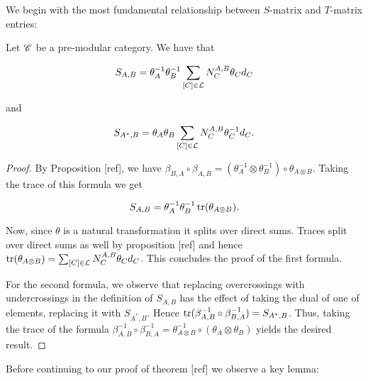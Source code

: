 We begin with the most fundamental relationship between $S$-matrix and $T$-matrix entries:


\begin{lemma} Let $\mathscr{C}$ be a pre-modular category. We have that

$$S_{A,B}=\theta_A^{-1}\theta_{B}^{-1}\sum_{[C]\in \mathcal{L}}N^{A,B}_{C}\theta_{C}d_C$$

and

$$S_{A^*,B}=\theta_A\theta_{B}\sum_{[C]\in \mathcal{L}}N^{A,B}_{C}\theta^{-1}_{C}d_C.$$
\end{lemma}
\begin{proof} By Proposition [ref], we have $\beta_{B,A}\circ \beta_{A,B}=(\theta_{A}^{-1}\otimes \theta_{B}^{-1}) \circ \theta_{A\otimes B }$. Taking the trace of this formula we get

$$S_{A,B}=\theta_{A}^{-1}\theta_{B}^{-1}\operatorname{tr}(\theta_{A\otimes B}).$$

Now, since $\theta$ is a natural transformation it splits over direct sums. Traces split over direct sums as well by proposition [ref] and hence $\operatorname{tr}(\theta_{A\otimes B})=\sum_{[C]\in \mathcal{L}}N^{A,B}_{C}\theta_{C}d_C$. This concludes the proof of the first formula.

For the second formula, we observe that replacing overcrossings with undercrossings in the definition of $S_{A,B}$ has the effect of taking the dual of one of elements, replacing it with $S_{A^*,B}$. Hence $\operatorname{tr}(\beta_{A,B}^{-1}\circ \beta_{B,A}^{-1})=S_{A^*,B}$. Thus, taking the trace of the formula $\beta_{A,B}^{-1}\circ \beta_{B,A}^{-1}=\theta^{-1}_{A\otimes B }\circ (\theta_{A}\otimes \theta_{B})$ yields the desired result.
\end{proof}

Before continuing to our proof of theorem [ref] we observe a key lemma:


